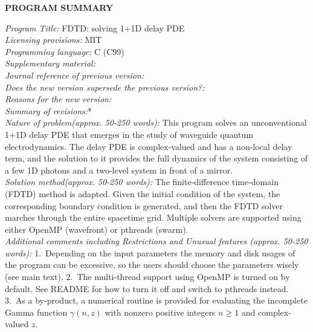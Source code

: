 \documentclass[final,1p,times]{elsarticle}
\begin{document}


{\bf PROGRAM SUMMARY}

\begin{small}
\noindent
{\em Program Title:} FDTD: solving 1+1D delay PDE                                          \\
{\em Licensing provisions:} MIT                                  \\
{\em Programming language:} C (C99)                                  \\

{\em Supplementary material:}                               \\
{\em Journal reference of previous version:}                  \\
{\em Does the new version supersede the previous version?:}   \\
{\em Reasons for the new version:}\\
{\em Summary of revisions:}*\\

{\em Nature of problem(approx. 50-250 words):}
This program solves an unconventional 1+1D delay PDE that emerges in the study of waveguide quantum electrodynamics. The delay PDE is complex-valued and has a non-local delay term, and the solution to it provides the full dynamics of the system consisting of a few 1D photons and a two-level system in front of a mirror.\\

{\em Solution method(approx. 50-250 words):}
The finite-difference time-domain (FDTD) method is adapted. Given the initial condition of the system, the corresponding boundary condition is generated, and then the FDTD solver marches through the entire spacetime grid. Multiple solvers are supported using either OpenMP (wavefront) or pthreads (swarm).\\

{\em Additional comments including Restrictions and Unusual features (approx. 50-250 words):}
1.\ Depending on the input parameters the memory and disk usages of the program can be excessive, so the users should choose the parameters wisely (see main text).
2.\ The multi-thread support using OpenMP is turned on by default. See README for how to turn it off and switch to pthreads instead.
3.\ As a by-product, a numerical routine is provided for evaluating the incomplete Gamma function $\gamma(n, z)$ with nonzero positive integers $n\geq1$ and complex-valued $z$.
\\
   \\


\end{small}
\end{document}
